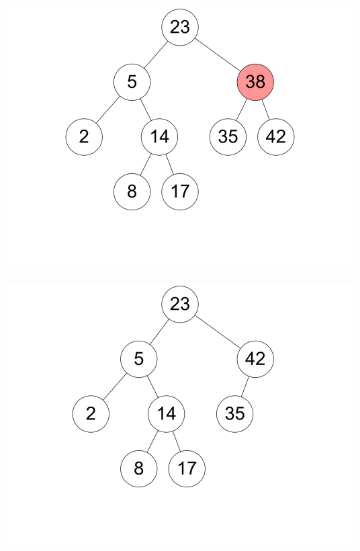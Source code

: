 \documentclass[11pt,a4paper]{article}
\begin{document}
\begin{loesung}
\begin{enumerate}
\begin{figure}[h!]
\begin{subfigure}[b]{0.23\textwidth}
                \includegraphics[width=\textwidth]{img/3a_15}
                \caption*{}
            \end{subfigure}
            \begin{subfigure}[b]{0.23\textwidth}
                \centering
                \includegraphics[width=\textwidth]{img/3a_16}
                \caption*{}
            \end{subfigure}
            \\
            \begin{subfigure}[b]{0.23\textwidth}
                \centering

\end{subfigure}
\end{figure}
\end{enumerate}
\end{loesung}
\end{document}

